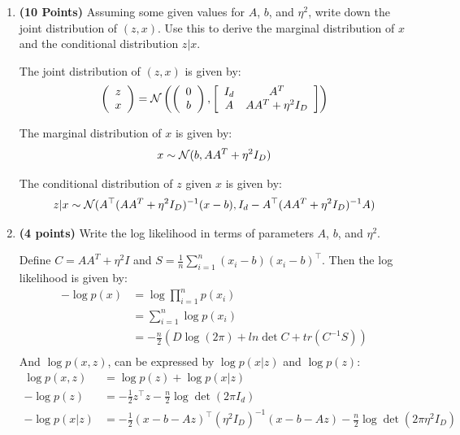 \begin{enumerate}
\item \textbf{(10 Points)}
Assuming some given values for $A$, $b$, and $\eta^2$, write down the joint distribution of $(z,x)$. Use this to derive the marginal
distribution of $x$ and the conditional distribution $z|x$. 

\begin{soln}
  The joint distribution of $(z,x)$ is given by:
  \begin{align*}
    \left(\begin{array}{c}z \\ x\end{array}\right) =
  \mathcal{N} \left( \left(\begin{array}{c} 0 \\ b \end{array} \right), 
  \left[ \begin{array}{cc} I_d & A^T \\ A &
    AA^T + \eta^2 I_D \end{array} \right] 
  \right)
  \end{align*}

  The marginal distribution of $x$ is given by:
  \begin{align*}
    x \sim \mathcal{N}(b, AA^T + \eta^2 I_D)
  \end{align*}

  The conditional distribution of $z$ given $x$ is given by:
  \begin{align*}
    z | x \sim \mathcal{N}(A^\top (AA^T + \eta^2 I_D)^{-1} (x - b), I_d - A^\top (AA^T + \eta^2 I_D)^{-1} A)
  \end{align*}
\end{soln}

\item \textbf{(4 points)}
Write the log likelihood in terms of parameters $A$, $b$, and $\eta^2$.

\begin{soln}
  Define $C = AA^T + \eta^2 I$ and $S = \frac{1}{n} \sum_{i=1}^n (x_i - b)(x_i -b)^\top$. Then the log likelihood is given by:
  \begin{align*}
    -\log p(x) &= \log \prod_{i=1}^n p(x_i) \\
    &= \sum_{i=1}^n \log p(x_i) \\
    &= -\frac{n}{2} (D \log (2\pi) + ln \det C + tr(C^{-1} S)) \\
  \end{align*}
  And $\log p(x,z)$, can be expressed by $\log p(x|z)$ and $\log p(z)$:
  \begin{align*}
    \log p(x,z) &= \log p(z) + \log p(x|z) \\
    -\log p(z) &= -\frac{1}{2} z^\top z - \frac{n}{2} \log \det (2\pi I_d) \\
    -\log p(x|z) &= -\frac{1}{2} (x - b - Az)^\top (\eta^2 I_D)^{-1} (x - b - Az) - \frac{n}{2} \log \det (2\pi \eta^2 I_D)
  \end{align*}
\end{soln}


\end{enumerate}
